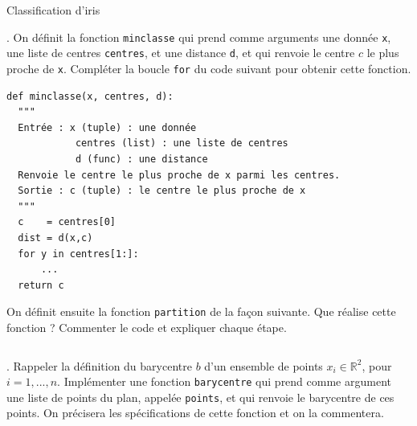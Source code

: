 \begin{exo}[PC][2][devoir]{Classification d'iris}
\begin{quest}
{  }
\end{quest}

 
\begin{quest}
  \item	 {}. On définit la fonction \texttt{minclasse} qui prend comme arguments une donnée \texttt{x}, une liste de centres \texttt{centres}, et une distance \texttt{d}, et qui renvoie le centre $c$ le plus proche de \texttt{x}. Compléter la boucle \texttt{for} du code suivant pour obtenir cette fonction.
\begin{verbatim}
def minclasse(x, centres, d):
  """
  Entrée : x (tuple) : une donnée
            centres (list) : une liste de centres
            d (func) : une distance
  Renvoie le centre le plus proche de x parmi les centres.
  Sortie : c (tuple) : le centre le plus proche de x
  """
  c    = centres[0]
  dist = d(x,c)
  for y in centres[1:]:
      ...
  return c
\end{verbatim}
  \item On définit ensuite la fonction \texttt{partition} de la façon suivante.  Que réalise cette fonction ? Commenter le code et expliquer chaque étape.
    \inputminted[linenos=true,frame=single]{python}{\pathtoexos/Info/Scripts/ia_partition_minclasse.py}
  \sol{
  
  }
\end{quest}


\begin{quest}
  \item	{}.  Rappeler la définition du barycentre $b$ d'un ensemble de points $x_i \in \mathbb{R}^2$, pour $i=1,...,n$. Implémenter une fonction \texttt{barycentre} qui prend comme argument une liste de points du plan, appelée \texttt{points}, et qui renvoie le barycentre de ces points. On précisera les spécifications de cette fonction et on la commentera.
\end{quest}


\end{exo}
